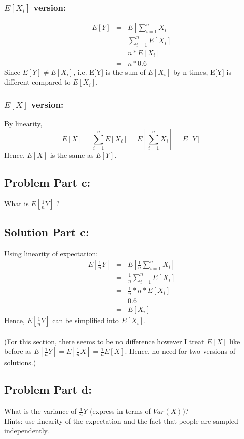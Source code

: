 \documentclass[12pt]{article}%
\begin{document}
\subsubsection*{$E[X_i]$ version:}
\begin{eqnarray*}
E[Y] & = & E[\sum_{i=1}^{n} X_i] \\
	 & = & \sum_{i=1}^{n} E[X_i] \\
	 & = & n * E[X_i] \\
	 & = & n * 0.6
\end{eqnarray*}
Since $E[Y] \neq E[X_i]$, i.e. E[Y] is the sum of $E[X_i]$ by n times, E[Y] is different compared to $E[X_i]$.
\subsubsection*{$E[X]$ version:}
By linearity, 
\begin{equation*}
E[X] = \sum_{i=1}^{n}E[X_i] = E[\sum_{i=1}^{n} X_i]= E[Y]
\end{equation*}
Hence, $E[X]$ is the same as $E[Y]$.
\subsection*{Problem Part c:}
What is $E[\frac{1}{n}Y]$ ?
\subsection*{Solution Part c:}
Using linearity of expectation: 
\begin{eqnarray*}
E[\frac{1}{n}Y] & = & E[\frac{1}{n}\sum_{i=1}^{n} X_i] \\
	 & = & \frac{1}{n}\sum_{i=1}^{n} E[X_i] \\
	 & = & \frac{1}{n} * n * E[X_i] \\
	 & = & 0.6 \\
	 & = & E[X_i]
\end{eqnarray*}
Hence, $E[\frac{1}{n}Y]$ can be simplified into $E[X_i]$. \\ \\
(For this section, there seems to be no difference however I treat $E[X]$ like before as $E[\frac{1}{n}Y] = E[\frac{1}{n}X] = \frac{1}{n}E[X]$. Hence, no need for two versions of solutions.)
\subsection*{Problem Part d:}
What is the variance of $\frac{1}{n}Y$ (express in terms of $Var(X)$)? \\
Hints: use linearity of the expectation and the fact that people are sampled independently.
\end{document}
